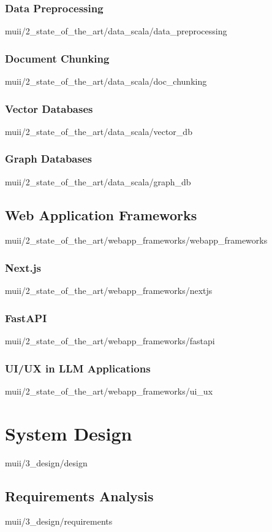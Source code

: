 \documentclass[english,epsbased,copyright,final,printable,covers,extendedindex,firstnumbered,tfm,gnuplot,loc,loe,lof,lot]{tfgtfmthesisuam}
\begin{document}
      \subsection{Data Preprocessing\label{SS:DATAPREPROC}}{muii/2_state_of_the_art/data_scala/data_preprocessing}
      \subsection{Document Chunking\label{SS:CHUNKING}}{muii/2_state_of_the_art/data_scala/doc_chunking}
      \subsection{Vector Databases\label{SS:VECTORSTORE}}{muii/2_state_of_the_art/data_scala/vector_db}
      \subsection{Graph Databases\label{SS:GRAPHDB}}{muii/2_state_of_the_art/data_scala/graph_db}

    \section{Web Application Frameworks\label{SEC:WEBAPP_FRAMEWORKS}}{muii/2_state_of_the_art/webapp_frameworks/webapp_frameworks}
      \subsection{Next.js\label{SS:NEXTJS}}{muii/2_state_of_the_art/webapp_frameworks/nextjs}
      \subsection{FastAPI\label{SS:FASTAPI}}{muii/2_state_of_the_art/webapp_frameworks/fastapi}
      \subsection{UI/UX in LLM Applications\label{SS:USER_INTERFACE}}{muii/2_state_of_the_art/webapp_frameworks/ui_ux}

  \chapter{System Design\label{CAP:DESIGN}}{muii/3_design/design}
    \section{Requirements Analysis\label{SEC:REQUIREMENTS}}{muii/3_design/requirements}
\end{document}

